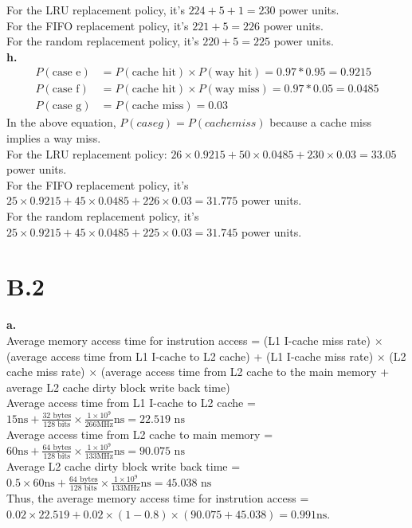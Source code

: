 \documentclass{article}
\begin{document}
\indent For the LRU replacement policy, it's $224+5+1=230$ power units.\\

\indent For the FIFO replacement policy, it's $221+5=226$ power units.\\

\indent For the random replacement policy, it's $220+5=225$ power units.\\

\textbf{h.}\\
\begin{align*}
  P(\text{case e}) &= P(\text{cache hit})\times P(\text{way hit})=0.97*0.95=0.9215\\
  P(\text{case f}) &= P(\text{cache hit})\times P(\text{way miss})=0.97*0.05=0.0485\\
  P(\text{case g}) &= P(\text{cache miss})=0.03
\end{align*}
In the above equation, $P(case g) = P(cache miss)$ because a cache miss implies a way miss.\\
\indent For the LRU replacement policy: $26\times 0.9215+50\times 0.0485+230\times 0.03=33.05$ power units.\\

\indent For the FIFO replacement policy, it's $25\times 0.9215+45\times 0.0485+226\times 0.03=31.775$ power units.\\

\indent For the random replacement policy, it's $25\times 0.9215+45\times 0.0485+225\times 0.03=31.745$ power units.\\

\section{B.2}

\indent \textbf{a.}\\
Average memory access time for instrution access = (L1 I-cache miss rate) $\times$ (average access time from L1 I-cache to L2 cache) + (L1 I-cache miss rate) $\times$ (L2 cache miss rate) $\times$ (average access time from L2 cache to the main memory + average L2 cache dirty block write back time)\\
Average access time from L1 I-cache to L2 cache = $15\text{ns}+\frac{32\text{ bytes}}{128\text{ bits}}\times\frac{1\times 10^9}{266 \text{MHz}}\text{ns}=22.519\text{ ns}$\\
Average access time from L2 cache to main memory = $60\text{ns}+\frac{64\text{ bytes}}{128\text{ bits}}\times\frac{1\times 10^9}{133 \text{MHz}}\text{ns}=90.075\text{ ns}$\\
Average L2 cache dirty block write back time = $0.5\times 60\text{ns}+\frac{64\text{ bytes}}{128\text{ bits}}\times\frac{1\times 10^9}{133 \text{MHz}}\text{ns}=45.038\text{ ns}$\\
Thus, the average memory access time for instrution access = $0.02\times 22.519+0.02\times (1-0.8)\times (90.075+45.038)=0.991\text{ns}$.\\
\end{document}
